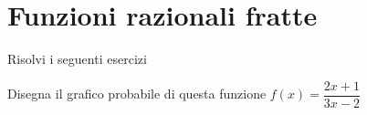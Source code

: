\section{Funzioni razionali fratte}
Risolvi i seguenti esercizi
\tcbstartrecording

%	
%	
%	
%		
%		
%		
%		
%		
%		
\begin{exercise}[no solution]
Disegna il grafico probabile di questa funzione $f(x)= \dfrac{2x+1}{3x-2}$
\end{exercise}
